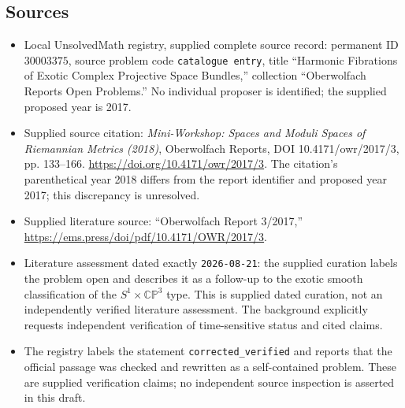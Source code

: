 \documentclass[11pt]{article}
\begin{document}
\subsection{Sources}
\begin{itemize}
\item Local UnsolvedMath registry, supplied complete source record: permanent ID \(30003375\), source problem code \texttt{catalogue entry}, title ``Harmonic Fibrations of Exotic Complex Projective Space Bundles,'' collection ``Oberwolfach Reports Open Problems.'' No individual proposer is identified; the supplied proposed year is 2017.
\item Supplied source citation: \emph{Mini-Workshop: Spaces and Moduli Spaces of Riemannian Metrics (2018)}, Oberwolfach Reports, DOI 10.4171/owr/2017/3, pp. 133--166. \url{https://doi.org/10.4171/owr/2017/3}. The citation's parenthetical year 2018 differs from the report identifier and proposed year 2017; this discrepancy is unresolved.
\item Supplied literature source: ``Oberwolfach Report 3/2017,'' \url{https://ems.press/doi/pdf/10.4171/OWR/2017/3}.
\item Literature assessment dated exactly \texttt{2026-08-21}: the supplied curation labels the problem open and describes it as a follow-up to the exotic smooth classification of the \(S^1\times\mathbb{CP}^3\) type. This is supplied dated curation, not an independently verified literature assessment. The background explicitly requests independent verification of time-sensitive status and cited claims.
\item The registry labels the statement \texttt{corrected\_verified} and reports that the official passage was checked and rewritten as a self-contained problem. These are supplied verification claims; no independent source inspection is asserted in this draft.
\end{itemize}
\end{document}
